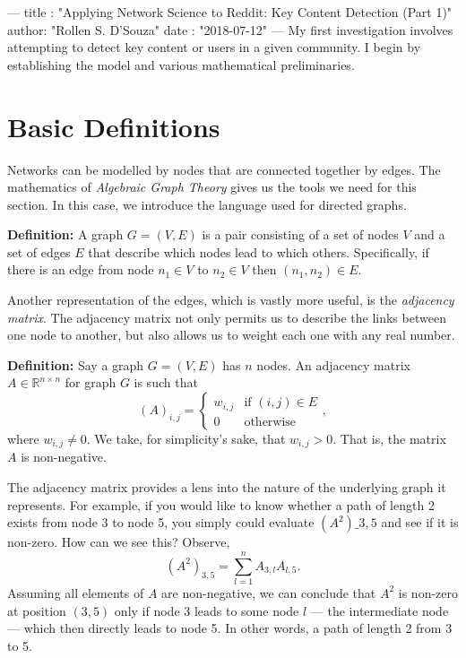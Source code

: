 ---
title :   "Applying Network Science to Reddit: Key Content Detection (Part 1)"
author:   "Rollen S. D'Souza"
date  :   "2018-07-12"
---
My first investigation involves attempting to detect key content or users in a given community.
I begin by establishing the model and various mathematical preliminaries.

\section{Basic Definitions}
Networks can be modelled by nodes that are connected together by edges.
The mathematics of \emph{Algebraic Graph Theory} gives us the tools we need for this section.
In this case, we introduce the language used for directed graphs.

\textbf{Definition:} A graph \(G = (V, E)\) is a pair consisting of a set of nodes \(V\) and a set of edges \(E\) that describe which nodes lead to which others.
Specifically, if there is an edge from node \(n_1 \in V\) to \(n_2 \in V\) then \((n_1, n_2) \in E.\)

Another representation of the edges, which is vastly more useful, is the \emph{adjacency matrix}.
The adjacency matrix not only permits us to describe the links between one node to another, but also allows us to weight each one with any real number.

\textbf{Definition:} Say a graph \(G=(V,E)\) has \(n\) nodes.
An adjacency matrix \(A\in \mathbb{R}^{n\times n}\) for graph \(G\) is such that
\[
  (A)_{i,j}
    =
      \begin{cases}
        w_{i,j}  & \text{if } (i,j) \in E \\
        0 & \text{otherwise}
      \end{cases},
\]
where \(w_{i,j} \neq 0.\)
We take, for simplicity's sake, that \(w_{i,j} > 0.\)
That is, the matrix \(A\) is non-negative.

The adjacency matrix provides a lens into the nature of the underlying graph it represents.
For example, if you would like to know whether a path of length 2 exists from node 3 to node 5, you simply could evaluate \((A^2)\_{3,5}\) and see if it is non-zero.
How can we see this? Observe,
\[(A^2)_{3,5} = \sum_{l = 1}^n A_{3,l} A_{l, 5}.\]
Assuming all elements of \(A\) are non-negative, we can conclude that \(A^2\) is non-zero at position \((3,5)\) only if node 3 leads to some node \(l\) --- the intermediate node --- which then directly leads to node 5.
In other words, a path of length 2 from 3 to 5.

